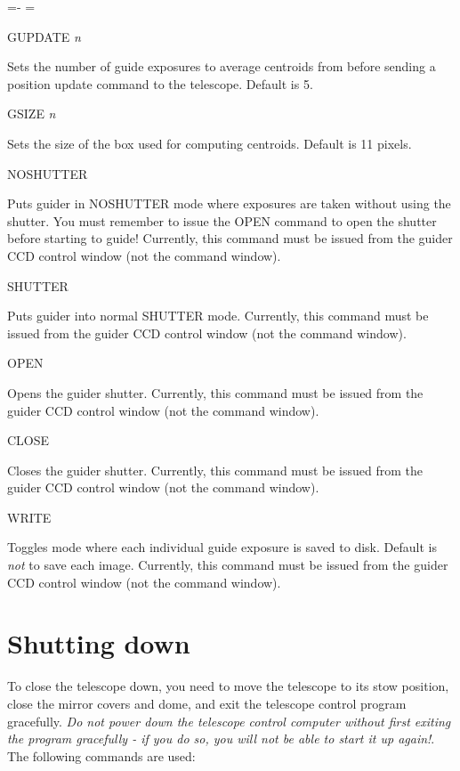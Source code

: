 \documentclass[10pt]{report}
\renewcommand{\[}{\begin{eqnarray}}
\renewcommand{\]}{\end{eqnarray}}
\newenvironment{hanging}{
	\begin{list}{}{
		\labelsep=0pt
		\labelwidth=0pt
		\listparindent=0pt
		\itemindent=-\leftmargini
		\leftmargin=\leftmargini
	}
}{
	\end{list}
}
\begin{document}
\begin{hanging}

\item GUPDATE \textit{n}

Sets the number of guide exposures to average centroids from before sending
a position update command to the telescope. Default is 5.

\item GSIZE \textit{n}

Sets the size of the box used for computing centroids. Default is 11 pixels.

\item NOSHUTTER

Puts guider in NOSHUTTER mode where exposures are taken without using the
shutter. You must remember to issue the OPEN command to open the shutter
before starting to guide! 
Currently, this command must be issued from the
guider CCD control window (not the command window).

\item SHUTTER

Puts guider into normal SHUTTER mode.
Currently, this command must be issued from the
guider CCD control window (not the command window).

\item OPEN

Opens the guider shutter.
Currently, this command must be issued from the
guider CCD control window (not the command window).

\item CLOSE

Closes the guider shutter.
Currently, this command must be issued from the
guider CCD control window (not the command window).

\item WRITE

Toggles mode where each individual guide exposure is saved to disk. Default
is \textit{not} to save each image.
Currently, this command must be issued from the
guider CCD control window (not the command window).

\end{hanging}

\chapter{Shutting down}

To close the telescope down, you need to move the telescope to its stow
position, close the mirror covers and dome, and exit the telescope control
program gracefully. {\it Do not power down the telescope control computer
without first exiting the program gracefully - if you do so, you will not
be able to start it up again!}. The following commands are used:
\end{document}
